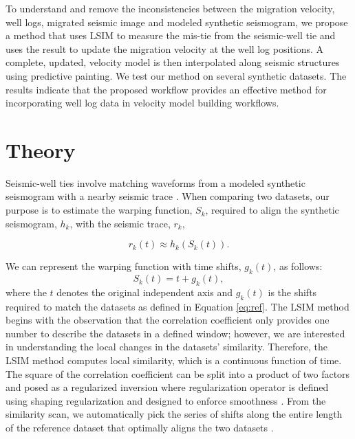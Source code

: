 To understand and remove the inconsistencies between the migration velocity, well logs, migrated seismic image and modeled synthetic seismogram, we propose a method that uses LSIM to measure the mis-tie from the seismic-well tie and uses the result to update the migration velocity at the well log positions. A complete, updated, velocity model is then interpolated along seismic structures using predictive painting. We test our method on several synthetic datasets. The results indicate that the proposed workflow provides an effective method for incorporating well log data in velocity model building workflows.


\section{Theory}

Seismic-well ties involve matching waveforms from a modeled synthetic seismogram with a nearby seismic trace \cite[]{whitesimm2003}. When comparing two datasets, our purpose is to estimate the warping function, $S_k$, required to align the synthetic seismogram, $h_k$, with the seismic trace, $r_k$,

\begin{equation} \label{eq:ref}
r_k(t) \approx h_k(S_k(t)).
\end{equation}

We can represent the warping function with time shifts, $g_k(t)$, as follows:
\begin{equation}\label{eq:shifts}
S_k(t) = t + g_k(t),
\end{equation}
where the $t$ denotes the original independent axis and $g_k(t)$ is the shifts required to match the datasets as defined in Equation \ref{eq:ref}. The LSIM method begins with the observation that the correlation coefficient only provides one number to describe the datasets in a defined window; however, we are interested in understanding the local changes in the datasets' similarity. Therefore, the LSIM method computes local similarity, which is a continuous function of time. The square of the correlation coefficient can be split into a product of two factors and posed as a regularized inversion where regularization operator is defined using shaping regularization and designed to enforce smoothness \cite[]{fomel2007local,fomel2007shaping}. From the similarity scan, we automatically pick the series of shifts along the entire length of the reference dataset that optimally aligns the two datasets \cite[]{fomel2009time,bader2017semiautomatic}.

